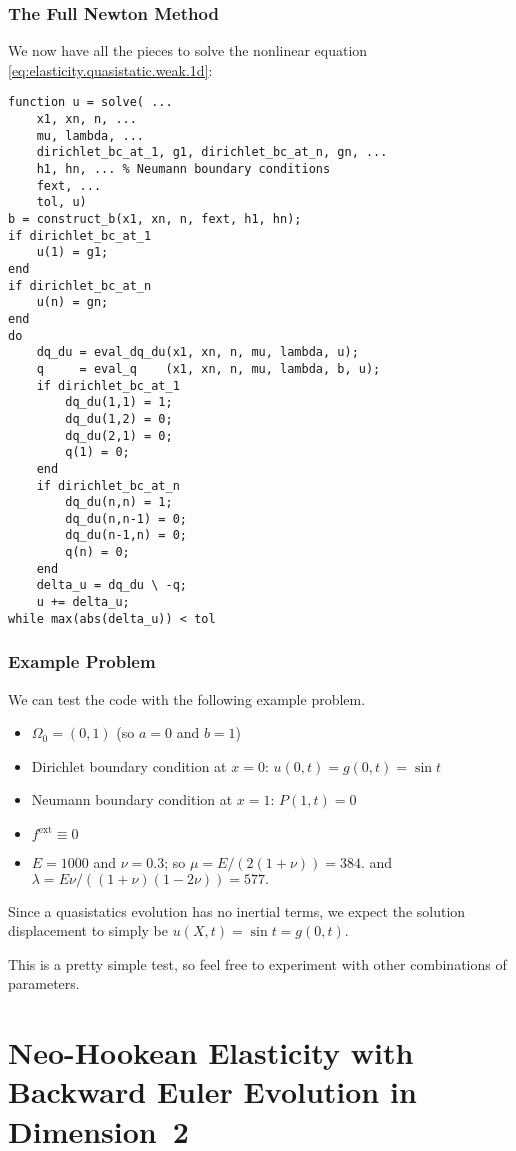 \subsubsection{The Full Newton Method}

We now have all the pieces to solve the nonlinear equation \eqref{eq:elasticity.quasistatic.weak.1d}:
\begin{verbatim}
function u = solve( ...
    x1, xn, n, ...
    mu, lambda, ...
    dirichlet_bc_at_1, g1, dirichlet_bc_at_n, gn, ...
    h1, hn, ... % Neumann boundary conditions
    fext, ...
    tol, u)
b = construct_b(x1, xn, n, fext, h1, hn);
if dirichlet_bc_at_1
    u(1) = g1;
end
if dirichlet_bc_at_n
    u(n) = gn;
end
do
    dq_du = eval_dq_du(x1, xn, n, mu, lambda, u);
    q     = eval_q    (x1, xn, n, mu, lambda, b, u);
    if dirichlet_bc_at_1
        dq_du(1,1) = 1;
        dq_du(1,2) = 0;
        dq_du(2,1) = 0;
        q(1) = 0;
    end
    if dirichlet_bc_at_n
        dq_du(n,n) = 1;
        dq_du(n,n-1) = 0;
        dq_du(n-1,n) = 0;
        q(n) = 0;
    end
    delta_u = dq_du \ -q;
    u += delta_u;
while max(abs(delta_u)) < tol
\end{verbatim}

\subsubsection{Example Problem}

We can test the code with the following example problem.
\begin{itemize}
\item $\Omega_0 = (0,1)$ (so $a = 0$ and $b = 1$)
\item Dirichlet boundary condition at $x = 0$: $u(0,t) = g(0,t) = \sin t$
\item Neumann boundary condition at $x = 1$: $P(1,t) = 0$
\item $f^{\text{ext}} \equiv 0$
\item $E = 1000$ and $\nu = 0.3$; so $\mu = E / (2 (1 + \nu)) = 384.$ and $\lambda = E \nu / ((1 + \nu) (1 - 2\nu)) = 577.$
\end{itemize}
Since a quasistatics evolution has no inertial terms, we expect the solution displacement to simply be $u(X,t) = \sin t = g(0,t)$.

This is a pretty simple test, so feel free to experiment with other combinations of parameters.

\section{Neo-Hookean Elasticity with Backward Euler Evolution in Dimension~2}

